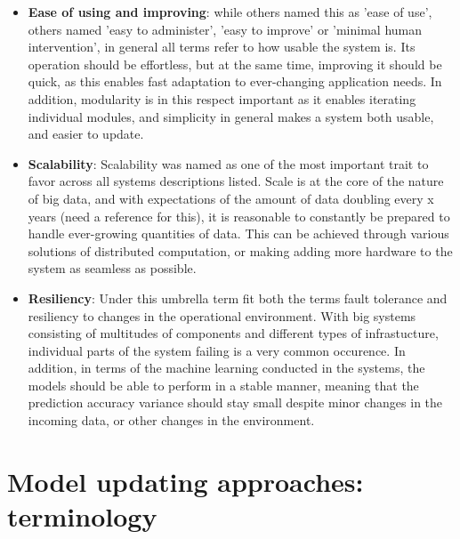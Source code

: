 \begin{itemize}
    \item \textbf{Ease of using and improving}: while others named this as 'ease of use', others named 'easy to administer', 'easy to improve' or 'minimal human intervention', in general all terms refer to how usable the system is. Its operation should be effortless, but at the same time, improving it should be quick, as this enables fast adaptation to ever-changing application needs. In addition, modularity is in this respect important as it enables iterating individual modules, and simplicity in general makes a system both usable, and easier to update.
    \item \textbf{Scalability}: Scalability was named as one of the most important trait to favor across all systems descriptions listed. Scale is at the core of the nature of big data, and with expectations of the amount of data doubling every x years (need a reference for this), it is reasonable to constantly be prepared to handle ever-growing quantities of data. This can be achieved through various solutions of distributed computation, or making adding more hardware to the system as seamless as possible.
    \item \textbf{Resiliency}: Under this umbrella term fit both the terms fault tolerance and resiliency to changes in the operational environment. With big systems consisting of multitudes of components and different types of infrastucture, individual parts of the system failing is a very common occurence. In addition, in terms of the machine learning conducted in the systems, the models should be able to perform in a stable manner, meaning that the prediction accuracy variance should stay small despite minor changes in the incoming data, or other changes in the environment.
\end{itemize}

\section{Model updating approaches: terminology}





